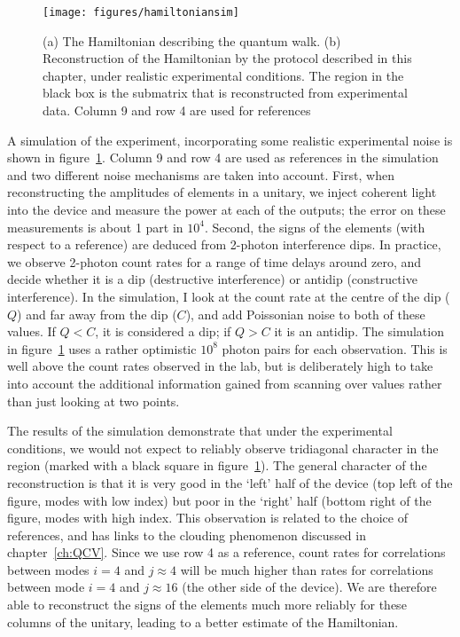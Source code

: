 \begin{figure}
  \centering
  \texttt{[image: figures/hamiltoniansim]}
  \caption[Simulation of the Hamiltonian tomography under experimental noise]
  {(a) The Hamiltonian describing the quantum walk. (b) Reconstruction of 
  the Hamiltonian by the protocol described in this chapter, under realistic
  experimental conditions. The region in the black box is the submatrix that is
  reconstructed from experimental data. Column 9 and row 4 are used for
  references}
  \label{fig:hamiltoniansim}
\end{figure}

A simulation of the experiment, incorporating some realistic experimental noise
is shown in figure~\ref{fig:hamiltoniansim}. Column 9 and row 4 are used as
references in the simulation and two different noise mechanisms are
taken into account. First, when reconstructing the amplitudes of elements in a
unitary, we inject coherent light into the device and measure the power at each
of the outputs; the error on these measurements is about 1 part in \(10^{4}\).
Second, the signs of the elements (with respect to a reference) are deduced from
2-photon interference dips. In practice, we observe 2-photon count rates for a
range of time delays around zero, and decide whether it is a dip (destructive
interference) or antidip (constructive interference). In the simulation, I look
at the count rate at the centre of the dip (\(Q\)) and far away from the dip
(\(C\)), and add Poissonian noise to both of these values. If \(Q<C\), it is
considered a dip; if \(Q>C\) it is an antidip. The simulation in
figure~\ref{fig:hamiltoniansim} uses a rather optimistic \(10^{8}\) photon pairs
for each observation. This is well above the count rates observed in the lab,
but is deliberately high to take into account the additional information gained
from scanning over values rather than just looking at two points.

The results of the simulation demonstrate that under the experimental
conditions, we would not expect to reliably observe tridiagonal character in the
region (marked with a black square in figure~\ref{fig:hamiltoniansim}). The
general character of the reconstruction is that it is very good in the `left'
half of the device (top left of the figure, modes with low index) but poor in
the `right' half (bottom right of the figure, modes with high index. This
observation is related to the choice of references, and has links to the
clouding phenomenon discussed in chapter~\ref{ch:QCV}. Since we use row 4 as a
reference, count rates for correlations between modes \(i=4\) and \(j \approx
4\) will be much higher than rates for correlations between mode \(i=4\) and \(j
\approx 16\) (the other side of the device). We are therefore able to
reconstruct the signs of the elements much more reliably for these columns of
the unitary, leading to a better estimate of the Hamiltonian.

